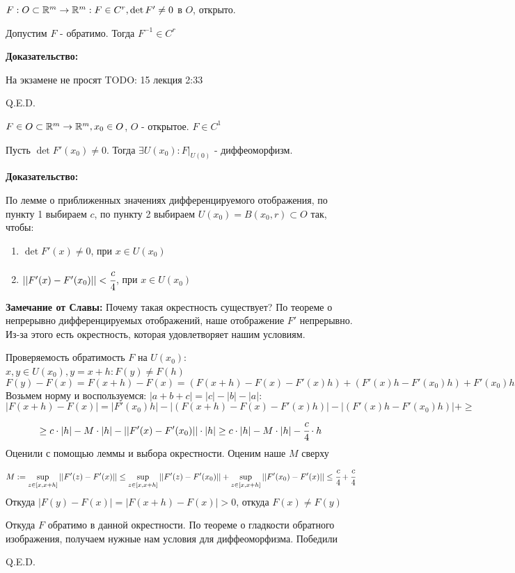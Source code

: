 $F: O \subset \mathbb{R}^m \rightarrow \mathbb{R}^m : F \in C^r, \det F'\neq 0$ в $O$, открыто.

Допустим $F$ - обратимо. Тогда $F^{-1}\in C^r$

\textbf{Доказательство:}

На экзамене не просят TODO: 15 лекция 2:33

\hfill Q.E.D.


$F \in O \subset \mathbb{R}^m \rightarrow \mathbb{R}^m, x_0 \in O$, $O$ - открытое. $F \in C^1$

Пусть $\det F'(x_0) \neq 0$. Тогда $\exists U(x_0):F\Big|_{U(0)}$ - диффеоморфизм.

\textbf{Доказательство:}

По лемме о приближенных значениях дифференцируемого отображения, по пункту 1 выбираем  $c$, по пункту 2 выбираем $U(x_0) = B(x_0,r)\subset O$ так, чтобы:
\begin{enumerate}
    \item $\det F'(x) \neq0$, при $x \in U(x_0)$
    \item $||F'(x)-F'(x_0)||< \cfrac{c}{4}$, при $x\in U(x_0)$
\end{enumerate}

\textbf{Замечание от Славы:} Почему такая окрестность существует? По теореме о непрерывно дифференцируемых отображений, наше отображение $F'$ непрерывно. Из-за этого есть окрестность, которая удовлетворяет нашим условиям.


Проверяемость обратимость $F$ на $U(x_0)$: $x,y \in U(x_0), y = x+h: F(y) \neq F(h)$
$$F(y)-F(x)=F(x+h)-F(x) = (F(x+h) - F(x) - F'(x)h) + (F'(x)h - F'(x_0)h) + F'(x_0)h$$
Возьмем норму и воспользуемся:  $|a+ b+ c| = |c|-|b|-|a|$:
$$|F(x+h)-F(x) |=|F'(x_0)h|  -|(F(x+h) - F(x) - F'(x)h)| - |(F'(x)h - F'(x_0)h)| + \geq $$
$$\geq c \cdot |h|  - M \cdot |h| -||F'(x)-F'(x_0)||\cdot|h|\geq c\cdot |h| - M \cdot |h| - \cfrac{c}{4}\cdot h$$
Оценили с помощью леммы и выбора окрестности. Оценим наше $M$ сверху
$$M:=\sup\limits_{z\in [x,x+h]}||F'(z)-F'(x)||\leq\sup\limits_{z\in [x,x+h]}||F'(z)-F'(x_0)|| + \sup\limits_{z\in [x,x+h]}||F'(x_0)-F'(x)|| \leq \cfrac{c}{4}+ \cfrac{c}{4} $$
Откуда $|F(y)-F(x)| = |F(x+h)-F(x)|>0$, откуда $F(x) \neq F(y)$

Откуда $F$ обратимо в данной окрестности. По теореме о гладкости обратного изображения, получаем нужные нам условия для диффеоморфизма. Победили

\hfill Q.E.D.


